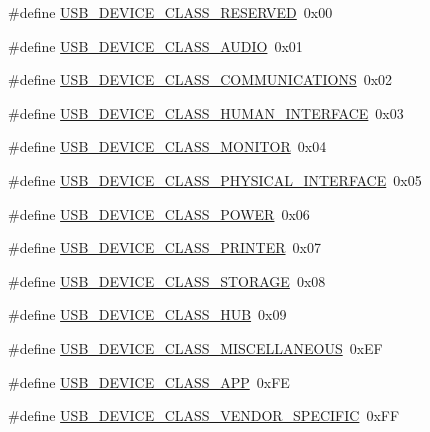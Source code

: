 \begin{DoxyCompactItemize}
\item 
\#define \hyperlink{group__USBD__Core_gaca7ece737f3f37b7a6f458fc24864776}{U\+S\+B\+\_\+\+D\+E\+V\+I\+C\+E\+\_\+\+C\+L\+A\+S\+S\+\_\+\+R\+E\+S\+E\+R\+V\+ED}~0x00
\item 
\#define \hyperlink{group__USBD__Core_gade360faee3b601af707b65122a46d446}{U\+S\+B\+\_\+\+D\+E\+V\+I\+C\+E\+\_\+\+C\+L\+A\+S\+S\+\_\+\+A\+U\+D\+IO}~0x01
\item 
\#define \hyperlink{group__USBD__Core_gab6fd7e18adf5c748a6b56391c1c2b819}{U\+S\+B\+\_\+\+D\+E\+V\+I\+C\+E\+\_\+\+C\+L\+A\+S\+S\+\_\+\+C\+O\+M\+M\+U\+N\+I\+C\+A\+T\+I\+O\+NS}~0x02
\item 
\#define \hyperlink{group__USBD__Core_ga3d9e0560a81b4dfd30bbf829960dbfab}{U\+S\+B\+\_\+\+D\+E\+V\+I\+C\+E\+\_\+\+C\+L\+A\+S\+S\+\_\+\+H\+U\+M\+A\+N\+\_\+\+I\+N\+T\+E\+R\+F\+A\+CE}~0x03
\item 
\#define \hyperlink{group__USBD__Core_ga23d001aa49fada2019ff3a4886a9f2a5}{U\+S\+B\+\_\+\+D\+E\+V\+I\+C\+E\+\_\+\+C\+L\+A\+S\+S\+\_\+\+M\+O\+N\+I\+T\+OR}~0x04
\item 
\#define \hyperlink{group__USBD__Core_ga6053794e5de119b37615ec98f7eceedb}{U\+S\+B\+\_\+\+D\+E\+V\+I\+C\+E\+\_\+\+C\+L\+A\+S\+S\+\_\+\+P\+H\+Y\+S\+I\+C\+A\+L\+\_\+\+I\+N\+T\+E\+R\+F\+A\+CE}~0x05
\item 
\#define \hyperlink{group__USBD__Core_ga88a8b2d45b2950ffd5654e4c3b6741ff}{U\+S\+B\+\_\+\+D\+E\+V\+I\+C\+E\+\_\+\+C\+L\+A\+S\+S\+\_\+\+P\+O\+W\+ER}~0x06
\item 
\#define \hyperlink{group__USBD__Core_gae6181c6bdb18c0e6491dd189983b6bd2}{U\+S\+B\+\_\+\+D\+E\+V\+I\+C\+E\+\_\+\+C\+L\+A\+S\+S\+\_\+\+P\+R\+I\+N\+T\+ER}~0x07
\item 
\#define \hyperlink{group__USBD__Core_ga053d2a9c3c9856ee01589ebb64d2e09b}{U\+S\+B\+\_\+\+D\+E\+V\+I\+C\+E\+\_\+\+C\+L\+A\+S\+S\+\_\+\+S\+T\+O\+R\+A\+GE}~0x08
\item 
\#define \hyperlink{group__USBD__Core_gab8167347cb586d3f82a7ad95fa25bc22}{U\+S\+B\+\_\+\+D\+E\+V\+I\+C\+E\+\_\+\+C\+L\+A\+S\+S\+\_\+\+H\+UB}~0x09
\item 
\#define \hyperlink{group__USBD__Core_gabd79da65d7f8f58b37e402fa1442831a}{U\+S\+B\+\_\+\+D\+E\+V\+I\+C\+E\+\_\+\+C\+L\+A\+S\+S\+\_\+\+M\+I\+S\+C\+E\+L\+L\+A\+N\+E\+O\+US}~0x\+EF
\item 
\#define \hyperlink{group__USBD__Core_ga9b5f0021003a2fc948daf8d0f4768736}{U\+S\+B\+\_\+\+D\+E\+V\+I\+C\+E\+\_\+\+C\+L\+A\+S\+S\+\_\+\+A\+PP}~0x\+FE
\item 
\#define \hyperlink{group__USBD__Core_ga89b94b8bc3c5fa2ef7151b5d282f22bb}{U\+S\+B\+\_\+\+D\+E\+V\+I\+C\+E\+\_\+\+C\+L\+A\+S\+S\+\_\+\+V\+E\+N\+D\+O\+R\+\_\+\+S\+P\+E\+C\+I\+F\+IC}~0x\+FF
\end{DoxyCompactItemize}
